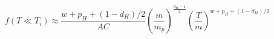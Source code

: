 \begin{equation}
f(T\ll T_i) \approx
\frac{ w +p_H +(1-d_H)/2}{AC}\left(\frac{m}{m_p}\right)^{\frac{d_H-1}{2}}  \left(
\frac{T}{m} \right )^{ w +p_H +(1-d_H)/2}
\label{contannih}
\end{equation}

